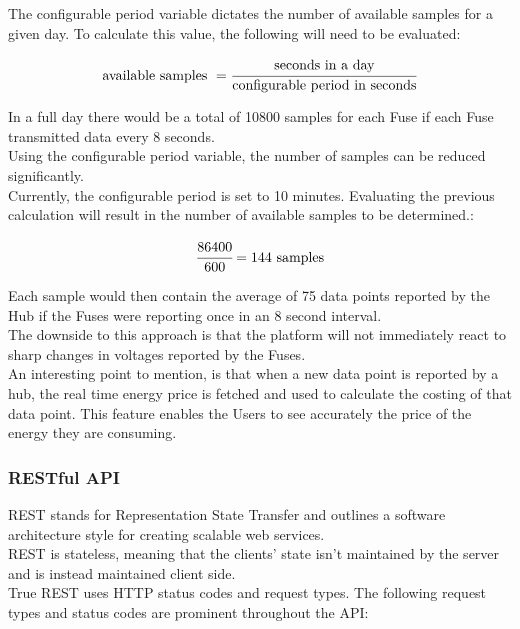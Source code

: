 \documentclass[draft,preprint,12pt,3p]{elsarticle}
\begin{document}
The configurable period variable dictates the number of available samples for a given day. To calculate this value, the following will need to be evaluated:

\begin{equation*} 
\text{available samples } = \cfrac{\text{seconds in a day}}{\text{configurable period in seconds}}
\end{equation*}

In a full day there would be a total of 10800 samples for each Fuse if each Fuse transmitted data every 8 seconds.\\
Using the configurable period variable, the number of samples can be reduced significantly.\\
Currently, the configurable period is set to 10 minutes. Evaluating the previous calculation will result in the number of available samples to be determined.:

\begin{equation*} 
 \cfrac{86400}{\text{600}} = 144 \text{ samples}
\end{equation*}

Each sample would then contain the average of 75 data points reported by the Hub if the Fuses were reporting once in an 8 second interval.\\
The downside to this approach is that the platform will not immediately react to sharp changes in voltages reported by the Fuses. \\
An interesting point to mention, is that when a new data point is reported by a hub, the real time energy price is fetched and used to calculate the costing of that data point. This feature enables the Users to see accurately the price of the energy they are consuming. 

\subsubsection{RESTful API}

REST stands for Representation State Transfer and outlines a software architecture style for creating scalable web services.\\
REST is stateless, meaning that the clients' state isn't maintained by the server and is instead maintained client side.\\
True REST uses HTTP status codes and request types. The following request types and status codes are prominent throughout the API:\\
\end{document}
